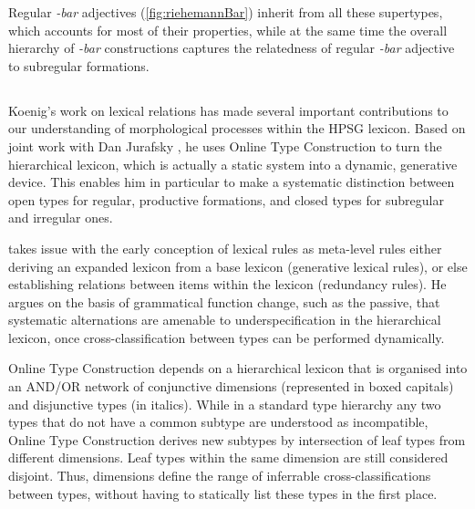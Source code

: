 \documentclass[output=paper,biblatex,babelshorthands,newtxmath,draftmode,colorlinks,citecolor=brown]{langscibook}
\begin{document}
\begin{exe}
  \ex
\end{exe}

Regular \textit{-bar} adjectives (\ref{fig:riehemannBar}) inherit from all these supertypes, which
accounts for most of their properties, while at the same time the overall hierarchy of \textit{-bar} constructions
captures the relatedness of regular \textit{-bar} adjective to subregular formations. 



\subsection{\texorpdfstring{\citet{Koenig99}}{Koenig (1999)}}

Koenig's work on lexical relations has made several important
contributions to our understanding of morphological processes within
the HPSG lexicon. Based on joint work with Dan Jurafsky
\citep{Koenig94}, he uses Online Type Construction to turn the
hierarchical lexicon, which is actually a static system into a
dynamic, generative device. This enables him in particular to make a
systematic distinction between open types for regular, productive
formations, and closed types for subregular and irregular ones.

\citet{Koenig99} takes issue with the early conception of lexical
rules as meta-level rules either deriving an expanded lexicon from a
base lexicon (generative lexical rules), or else establishing
relations between items within the lexicon (redundancy rules). He
argues on the basis of grammatical function change, such as the
 passive, that systematic alternations are amenable to
underspecification in the hierarchical lexicon,  once
cross-classification between types can be performed dynamically.

Online Type Construction depends on a hierarchical lexicon that is
organised into an AND/OR network of conjunctive dimensions
(represented in boxed capitals) and disjunctive types (in
italics). While in a standard type hierarchy any two types that do not
have a common subtype are understood as incompatible, Online Type
Construction derives new subtypes by intersection of leaf types from
different dimensions. Leaf types within the same dimension are still
considered disjoint. Thus, dimensions define the range of inferrable
cross-classifications between types, without having to statically list
these types in the first place.
\end{document}
